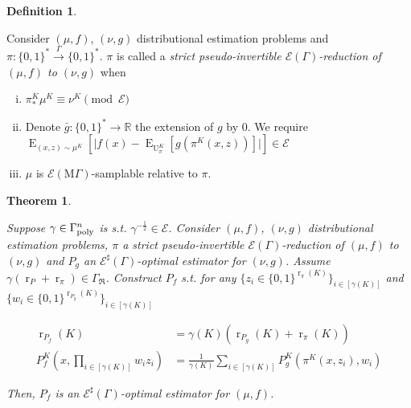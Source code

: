 \documentclass{article}
\numberwithin{equation}{section}
\theoremstyle{definition}
\newtheorem{definition}{Definition}[section]
\theoremstyle{plain}
\newtheorem{theorem}{Theorem}[section]
\newcommand{\Bool}{\{0,1\}}
\newcommand{\Words}{{\Bool^*}}
\DeclareMathOperator{\E}{E}
\DeclareMathOperator{\R}{r}
\DeclareMathOperator{\Un}{U}
\newcommand{\Reals}{\mathbb{R}}
\newcommand{\Abs}[1]{\lvert #1 \rvert}
\newcommand{\GrowR}{\Gamma_{\mathfrak{R}}}
\newcommand{\MGrow}{\mathrm{M}\Gamma}
\newcommand{\Fall}{\mathcal{E}}
\newcommand{\EG}{\Fall(\Gamma)}
\newcommand{\ESG}{\Fall^\sharp(\Gamma)}
\newcommand{\EMG}{\Fall(\MGrow)}
\newcommand{\BoolR}[1]{\Bool^{\R_{#1}(K)}}
\newcommand{\GammaPoly}{\Gamma_{\textnormal{poly}}}
\newcommand{\Scheme}{\xrightarrow{\Gamma}}
\begin{document}
\begin{samepage}
\begin{definition}
\label{def:sp_reduce}

Consider $(\mu,f)$, $(\nu,g)$ distributional estimation problems and ${\pi: \Words \Scheme \Words}$. $\pi$ is called a \emph{strict pseudo-invertible $\EG$-reduction of $(\mu,f)$ to $(\nu,g)$} when

\begin{enumerate}[(i)]

\item\label{con:def__sp_reduce__dist} $\pi_*^K\mu^{K} \equiv \nu^{K} \pmod \Fall$

\item\label{con:def__sp_reduce__fun} Denote ${\bar{g}: \Words \rightarrow \Reals}$ the extension of $g$ by 0. We require $\E_{(x,z) \sim \mu^{K}}[\Abs{f(x)-\E_{\Un_\pi^{K}}[g(\pi^{K}(x,z))]}] \in \Fall$

\item\label{con:def__sp_reduce__smp} $\mu$ is $\EMG$-samplable relative to $\pi$.

\end{enumerate}

\end{definition}
\end{samepage}

\begin{samepage}
\begin{theorem}
\label{thm:sp_reduce_sharp}

Suppose $\gamma \in \GammaPoly^n$ is s.t. $\gamma^{-\frac{1}{2}} \in \Fall$. Consider $(\mu,f)$, $(\nu,g)$ distributional estimation problems, $\pi$ a strict pseudo-invertible $\EG$-reduction of $(\mu, f)$ to $(\nu, g)$ and $P_g$ an $\ESG$-optimal estimator for $(\nu, g)$. Assume $\gamma (\R_P + \R_\pi) \in \GrowR$. Construct ${P_f}$ s.t. for any ${\{z_i \in \BoolR{\pi}\}_{i \in [\gamma(K)]}}$ and ${\{w_i \in \BoolR{P_g}\}_{i \in [\gamma(K)]}}$

\begin{align}
\label{eqn:thm__sp_reduce__rpf}\R_{P_f}(K) &= \gamma(K) (\R_{P_g}(K) + \R_\pi(K)) \\
\label{eqn:thm__sp_reduce__pf}P_f^K(x, \prod_{i \in [\gamma(K)]} w_i z_i) &= \frac{1}{\gamma(K)}\sum_{i \in [\gamma(K)]} P_g^K(\pi^K(x,z_i),w_i)
\end{align}

Then, $P_f$ is an $\ESG$-optimal estimator for $(\mu, f)$.

\end{theorem}
\end{samepage}
\end{document}
